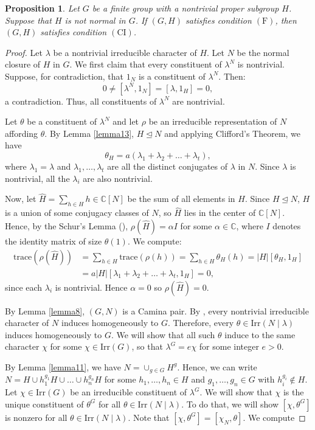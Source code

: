 \documentclass[twoside,a4paper,reqno,11pt]{amsart}
\newcommand{\<}{\langle}
\renewcommand{\>}{\rangle}
\newcommand{\CC}{\mathbb{C}}
\newcommand{\Irr}{\mathrm {Irr}}
\newcommand{\F}{\mathrm{(F)}}
\newcommand{\CI}{\mathrm{(CI)}}
\renewcommand{\:}{\colon}
\newtheorem{prop}[thm]{Proposition}
\theoremstyle{definition}
\begin{document}
\begin{prop}\label{propn17}
	Let $G$ be a finite group with a nontrivial proper subgroup $H$. Suppose that $H$ is not normal in $G$. If $(G,H)$ satisfies condition $\F$, then $(G,H)$ satisfies condition $\CI$.
\end{prop}
\begin{proof}
	Let $\lambda$ be a  nontrivial irreducible character of $H$. 
	Let $N$ be the normal closure of $H$ in $G$. We first claim that every constituent of  $\lambda^N$ is nontrivial. Suppose, for contradiction, that  $1_N$ is a constituent of $\lambda^N$.  Then:   $$0\neq [\lambda^N,1_N] = [\lambda,1_H]=0,$$ a contradiction. Thus, all constituents of $\lambda^N$ are nontrivial. 
	
	Let $\theta$ be a constituent of $\lambda^N$ and let $\rho$ be an irreducible representation of $N$ affording $\theta$.  By Lemma \ref{lemma13}, $H\unlhd N$ and applying Clifford's Theorem, we have 
\[		\theta_H = a(\lambda_1 + \lambda_2+\ldots + \lambda_t),\]
	where $\lambda_1 = \lambda$ and $\lambda_1,\dots,\lambda_t$ are all the distinct conjugates of $\lambda$ in $N$. Since $\lambda$ is nontrivial,  all the $\lambda_i$ are also nontrivial.
	
	 Now, let $\widehat{H}=\sum_{h\in H}h \in \mathbb{C}[N]$ be the sum of all elements in $H$. Since $H\unlhd N$, $H$ is a union of some conjugacy classes of $N$, so $\widehat{H}$ lies in the center of $\CC[N]$. Hence, by the Schur's Lemma (\cite[Lemma 2.25]{Isaacsbook}), $\rho(\widehat{H})=\alpha I$  for some $\alpha \in\CC$, where $I$ denotes the identity matrix of size $\theta(1)$. We  compute: 
	\begin{align*}
		\mathrm{trace}(\rho(\widehat{H})) &=  \sum_{h\in H}\mathrm{trace}(\rho(h)) = \sum_{h\in H}\theta_H(h) = |H|[\theta_H,1_H] \\
		&=a|H|[\lambda_1+\lambda_2+\ldots+\lambda_t,1_H] = 0,
	\end{align*} since each $\lambda_i$ is nontrivial. Hence $\alpha=0$ so $\rho(\widehat{H}) = 0$.   
	
	By Lemma \ref{lemma8}, $(G,N)$ is a Camina pair. By \cite[Lemma 4.1 (7)]{Lewis}, every nontrivial irreducible character of $N$ induces homogeneously to $G$.  
	Therefore, every $\theta\in \Irr(N\mid \lambda)$ induces homogeneously to $G$. 
	We will show that all such $\theta$ induce to the same  character $\chi$ for some $\chi\in \Irr(G)$, so that $\lambda^G=e\chi$  for some integer $e>0$.
	
	By Lemma \ref{lemma11}, we have $N = \cup_{g\in G}H^g$. Hence, we can write $N=H\cup h_1^{g_1}H\cup \ldots \cup h_n^{g_n}H$ for some $h_1,\ldots,h_n\in H$ and $g_1,\ldots,g_n\in G$ with $h_i^{g_i}\not\in H$.
	Let $\chi\in \Irr(G)$ be an irreducible constituent of $\lambda^G$. We will show that $\chi$ is the unique constituent of  $\theta^G$ for all  $\theta\in \Irr(N\mid \lambda)$. To do that, we will show $[\chi,\theta^G] $ is nonzero for all $\theta\in \Irr(N\mid\lambda)$. Note that $[\chi,\theta^G] = [\chi_N,\theta]$. We compute
	

\end{proof}
\end{document}
